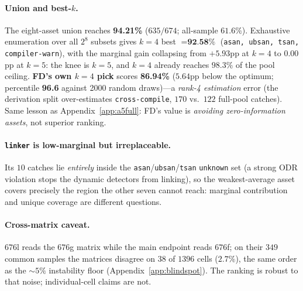 \paragraph{Union and best-$k$.} The eight-asset union reaches \textbf{94.21\%} ($635/674$;
all-sample $61.6\%$). Exhaustive enumeration over all $2^8$ subsets gives $k{=}4$ best $=
\textbf{92.58\%}$ (\texttt{asan, ubsan, tsan, compiler-warn}), with the marginal gain collapsing
from $+5.93$pp at $k{=}4$ to $0.00$pp at $k{=}5$: the knee is $k{=}5$, and $k{=}4$ already reaches
$98.3\%$ of the pool ceiling. \textbf{FD's own $k{=}4$ pick} scores \textbf{86.94\%} ($5.64$pp below
the optimum; percentile \textbf{96.6} against 2000 random draws)---a \emph{rank-4 estimation} error
(the derivation split over-estimates \texttt{cross-compile}, $170$ vs.\ $122$ full-pool catches).
Same lesson as Appendix~\ref{app:a5full}: FD's value is \emph{avoiding zero-information assets},
not superior ranking.

\paragraph{\texttt{linker} is low-marginal but irreplaceable.} Its $10$ catches lie \emph{entirely}
inside the \texttt{asan}/\texttt{ubsan}/\texttt{tsan} \texttt{unknown} set (a strong ODR violation
stops the dynamic detectors from linking), so the weakest-average asset covers precisely the region
the other seven cannot reach: marginal contribution and unique coverage are different questions.

\paragraph{Cross-matrix caveat.} $676$l reads the $676$g matrix while the main endpoint reads
$676$f; on their $349$ common samples the matrices disagree on $38$ of $1396$ cells ($2.7\%$), the
same order as the $\sim5\%$ instability floor (Appendix~\ref{app:blindspot}). The ranking is robust
to that noise; individual-cell claims are not.
